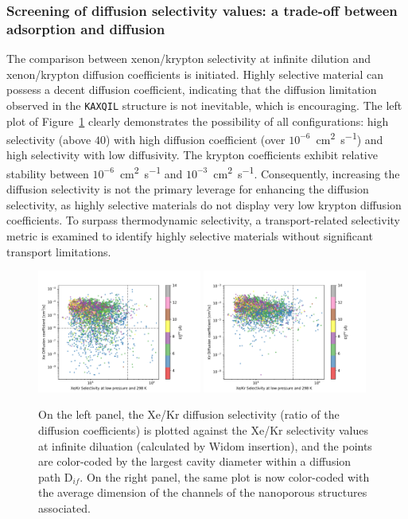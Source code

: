 \documentclass[main]{subfiles}
\begin{document}
\subsubsection{Screening of diffusion selectivity values: a trade-off between adsorption and diffusion}\label{sct:diff_screen}

The comparison between xenon/krypton selectivity at infinite dilution and xenon/krypton diffusion coefficients is initiated. Highly selective material can possess a decent diffusion coefficient, indicating that the diffusion limitation observed in the \texttt{KAXQIL} structure is not inevitable, which is encouraging. The left plot of Figure~\ref{fgr:diff_s0_lcd} clearly demonstrates the possibility of all configurations: high selectivity (above $40$) with high diffusion coefficient (over $10^{-6}$~\si{\square\cm\per\s}) and high selectivity with low diffusivity. The krypton coefficients exhibit relative stability between $10^{-6}$~\si{\square\cm\per\s} and $10^{-3}$~\si{\square\cm\per\s}. Consequently, increasing the diffusion selectivity is not the primary leverage for enhancing the diffusion selectivity, as highly selective materials do not display very low krypton diffusion coefficients. To surpass thermodynamic selectivity, a transport-related selectivity metric is examined to identify highly selective materials without significant transport limitations.

\begin{figure}[ht]
  \centering
    \includegraphics[width=0.48\textwidth]{figures/5-diffusion/D_xe-s0-lcd.pdf}
    \includegraphics[width=0.48\textwidth]{figures/5-diffusion/D_kr-s0-lcd.pdf}
    \caption{On the left panel, the Xe/Kr diffusion selectivity (ratio of the diffusion coefficients) is plotted against the Xe/Kr selectivity values at infinite diluation (calculated by Widom insertion), and the points are color-coded by the largest cavity diameter within a diffusion path D$_{if}$. On the right panel, the same plot is now color-coded with the average dimension of the channels of the nanoporous structures associated. }\label{fgr:diff_s0_lcd}
\end{figure}
\end{document}
